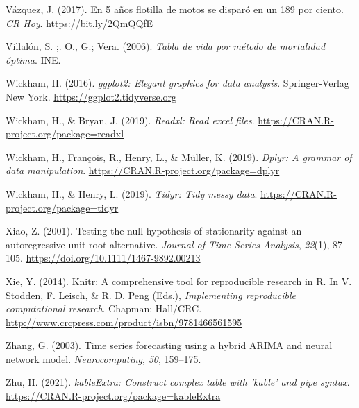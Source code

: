 \documentclass[
]{article}
\newlength{\cslhangindent}
\newlength{\cslentryspacingunit} %
\newenvironment{CSLReferences}[2] %
 {%
  \setlength{\parindent}{0pt}
  \ifodd #1
  \let\oldpar\par
  \def\par{\hangindent=\cslhangindent\oldpar}
  \fi
  \setlength{\parskip}{#2\cslentryspacingunit}
 }%
 {}
\begin{document}
\begin{CSLReferences}{1}{0}
\leavevmode{}%
Vázquez, J. (2017). En 5 años flotilla de motos se disparó en un 189 por
ciento. \emph{CR Hoy}. \url{https://bit.ly/2QmQQfE}

\leavevmode{}%
Villalón, S. ;. O., G.; Vera. (2006). \emph{Tabla de vida por método de
mortalidad óptima}. INE.

\leavevmode{}%
Wickham, H. (2016). \emph{ggplot2: Elegant graphics for data analysis}.
Springer-Verlag New York. \url{https://ggplot2.tidyverse.org}

\leavevmode{}%
Wickham, H., \& Bryan, J. (2019). \emph{Readxl: Read excel files}.
\url{https://CRAN.R-project.org/package=readxl}

\leavevmode{}%
Wickham, H., François, R., Henry, L., \& Müller, K. (2019). \emph{Dplyr:
A grammar of data manipulation}.
\url{https://CRAN.R-project.org/package=dplyr}

\leavevmode{}%
Wickham, H., \& Henry, L. (2019). \emph{Tidyr: Tidy messy data}.
\url{https://CRAN.R-project.org/package=tidyr}

\leavevmode{}%
Xiao, Z. (2001). Testing the null hypothesis of stationarity against an
autoregressive unit root alternative. \emph{Journal of Time Series
Analysis}, \emph{22}(1), 87--105.
\url{https://doi.org/10.1111/1467-9892.00213}

\leavevmode{}%
Xie, Y. (2014). Knitr: A comprehensive tool for reproducible research in
{R}. In V. Stodden, F. Leisch, \& R. D. Peng (Eds.), \emph{Implementing
reproducible computational research}. Chapman; Hall/CRC.
\url{http://www.crcpress.com/product/isbn/9781466561595}

\leavevmode{}%
Zhang, G. (2003). Time series forecasting using a hybrid ARIMA and
neural network model. \emph{Neurocomputing}, \emph{50}, 159--175.

\leavevmode{}%
Zhu, H. (2021). \emph{kableExtra: Construct complex table with 'kable'
and pipe syntax}. \url{https://CRAN.R-project.org/package=kableExtra}

\end{CSLReferences}
\end{document}
